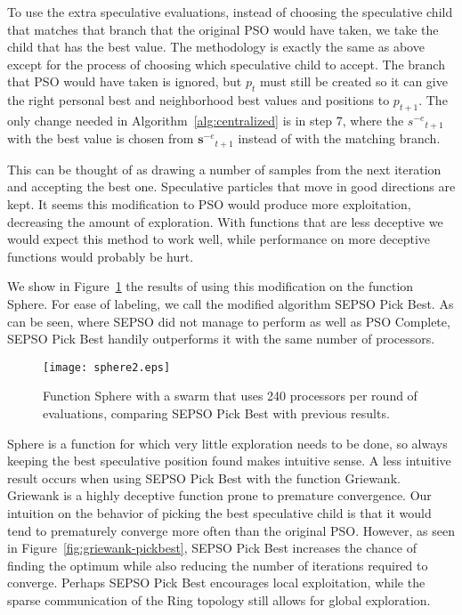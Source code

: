 \documentclass[journal,letterpaper]{IEEEtran}
\newcommand{\fig}[1]{Figure~\ref{fig:#1}}
\newcommand{\alg}[1]{Algorithm~\ref{alg:#1}}
\providecommand{\noeval}[1]{\ensuremath{#1^{-e}}}
\providecommand{\p}{\ensuremath{p}}
\providecommand{\s}{\ensuremath{s}}
\providecommand{\sset}{\ensuremath{\mathbf{s}}}
\begin{document}
To use the extra speculative evaluations, instead of choosing the speculative
child that matches that branch that the original PSO would have taken, we take
the child that has the best value.  The methodology is exactly the same as
above except for the process of choosing which speculative child to accept.
The branch that PSO would have taken is ignored, but $\p_t$ must still be
created so it can give the right personal best and neighborhood best values and
positions to $\p_{t+1}$.  The only change needed in \alg{centralized} is in
step 7, where the $\noeval{\s}_{t+1}$ with the best value is chosen from
$\noeval{\sset}_{t+1}$ instead of with the matching branch.

This can be thought of as drawing a number of samples from the next iteration
and accepting the best one.  Speculative particles that move in good directions
are kept.  It seems this modification to PSO would produce more exploitation,
decreasing the amount of exploration.  With functions that are less deceptive
we would expect this method to work well, while performance on more deceptive
functions would probably be hurt.

We show in \fig{sphere-pickbest} the results of using this modification on the
function Sphere.  For ease of labeling, we call the modified algorithm SEPSO
Pick Best.  As can be seen, where SEPSO did not manage to perform as well as
PSO Complete, SEPSO Pick Best handily outperforms it with the same number of
processors.

\begin{figure}
  \centering
  \texttt{[image: sphere2.eps]}
  \caption{Function Sphere with a swarm that uses 240 processors per round of
  evaluations, comparing SEPSO Pick Best with previous results.}
  \label{fig:sphere-pickbest}
\end{figure}

Sphere is a function for which very little exploration needs to be done, so
always keeping the best speculative position found makes intuitive sense.  A
less intuitive result occurs when using SEPSO Pick Best with the function
Griewank.  Griewank is a highly deceptive function prone to premature
convergence.  Our intuition on the behavior of picking the best speculative
child is that it would tend to prematurely converge more often than the
original PSO.  However, as seen in \fig{griewank-pickbest}, SEPSO Pick Best
increases the chance of finding the optimum while also reducing the number of
iterations required to converge.  Perhaps SEPSO Pick Best encourages local
exploitation, while the sparse communication of the Ring topology still allows
for global exploration.
\end{document}
